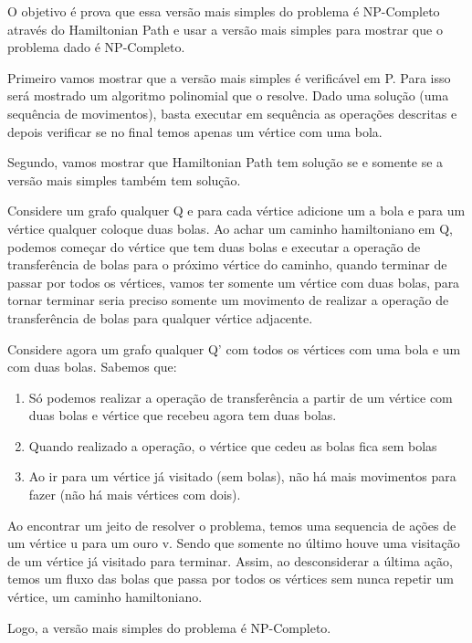 \documentclass[12pt]{article}
\begin{document}
\begin{enumerate}
{    O objetivo é prova que essa versão mais simples do problema é NP-Completo através do Hamiltonian Path e usar a versão mais simples para mostrar que o problema dado é NP-Completo.
    
    Primeiro vamos mostrar que a versão mais simples é verificável em P. Para isso será mostrado um algoritmo polinomial que o resolve. Dado uma solução (uma sequência de movimentos), basta executar em sequência as operações descritas e depois verificar se no final temos apenas um vértice com uma bola.
    
    Segundo, vamos mostrar que Hamiltonian Path tem solução se e somente se a versão mais simples também tem solução. 
    
    Considere um grafo qualquer Q e para cada vértice adicione um a bola e para um vértice qualquer coloque duas bolas. Ao achar um caminho hamiltoniano em Q, podemos começar do vértice que tem duas bolas e executar a operação de transferência de bolas para o próximo vértice do caminho, quando terminar de passar por todos os vértices, vamos ter somente um vértice com duas bolas, para tornar terminar seria preciso somente um movimento de realizar a operação de transferência de bolas para qualquer vértice adjacente.
    
    Considere agora um grafo qualquer Q' com todos os vértices com uma bola e um com duas bolas. Sabemos que:
    
    \begin{enumerate}
        \item Só podemos realizar a operação de transferência a partir de um vértice com duas bolas e vértice que recebeu agora tem duas bolas.
        \item Quando realizado a operação, o vértice que cedeu as bolas fica sem bolas
        \item Ao ir para um vértice já visitado (sem bolas), não há mais movimentos para fazer (não há mais vértices com dois).
    \end{enumerate}
    
    Ao encontrar um jeito de resolver o problema, temos uma sequencia de ações de um vértice u para um ouro v. Sendo que somente no último houve uma visitação de um vértice já visitado para terminar. Assim, ao desconsiderar a última ação, temos um fluxo das bolas que passa por todos os vértices sem nunca repetir um vértice, um caminho hamiltoniano.
    
    Logo, a versão mais simples do problema é NP-Completo. 
    
}
\end{enumerate}
\end{document}
